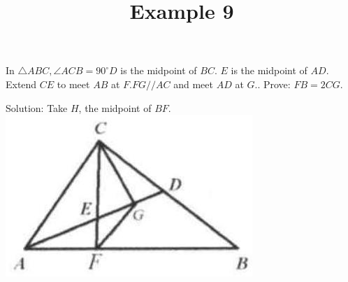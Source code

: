 \documentclass{article}
\title{Example 9}
\date{}
\begin{document}
\maketitle

In \(\triangle A B C, \angle A C B=90^{\circ} D\) is the midpoint of \(B C\). \(E\) is the midpoint of \(A D\). Extend \(C E\) to meet \(A B\) at \(F . F G / / A C\) and meet \(A D\) at \(G\).. Prove: \(F B=2 C G\).

Solution:
Take \(H\), the midpoint of \(B F\).\\
\centering
\includegraphics[width=\textwidth]{images/040(1).jpg}
\end{document}
